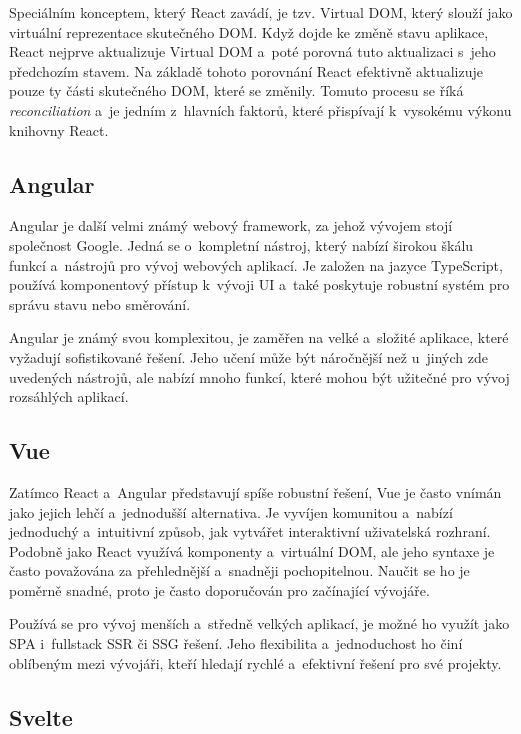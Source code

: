 Speciálním konceptem, který React zavádí, je tzv. Virtual DOM, který slouží jako virtuální reprezentace skutečného DOM.
Když dojde ke změně stavu aplikace, React nejprve aktualizuje Virtual DOM a~poté porovná tuto aktualizaci s~jeho předchozím stavem.
Na základě tohoto porovnání React efektivně aktualizuje pouze ty části skutečného DOM, které se změnily.
Tomuto procesu se říká \textit{reconciliation} a~je jedním z~hlavních faktorů, které přispívají k~vysokému výkonu knihovny React.~\cite{react}

\subsection{Angular}
\label{subsec:angular}

Angular je další velmi známý webový framework, za jehož vývojem stojí společnost Google.
Jedná se o~kompletní nástroj, který nabízí širokou škálu funkcí a~nástrojů pro vývoj webových aplikací.
Je založen na jazyce TypeScript, používá komponentový přístup k~vývoji UI a~také poskytuje robustní systém pro správu stavu nebo směrování.~\cite{angular}

Angular je známý svou komplexitou, je zaměřen na velké a~složité aplikace, které vyžadují sofistikované řešení.
Jeho učení může být náročnější než u~jiných zde uvedených nástrojů, ale nabízí mnoho funkcí, které mohou být užitečné pro vývoj rozsáhlých aplikací.~\cite{angular}

\subsection{Vue}
\label{subsec:vue}

Zatímco React a~Angular představují spíše robustní řešení, Vue je často vnímán jako jejich lehčí a~jednodušší alternativa.
Je vyvíjen komunitou a~nabízí jednoduchý a~intuitivní způsob, jak vytvářet interaktivní uživatelská rozhraní.
Podobně jako React využívá komponenty a~virtuální DOM, ale jeho syntaxe je často považována za přehlednější a~snadněji pochopitelnou.
Naučit se ho je poměrně snadné, proto je často doporučován pro začínající vývojáře.~\cite{vue}

Používá se pro vývoj menších a~středně velkých aplikací, je možné ho využít jako SPA i~fullstack SSR či SSG řešení.
Jeho flexibilita a~jednoduchost ho činí oblíbeným mezi vývojáři, kteří hledají rychlé a~efektivní řešení pro své projekty.~\cite{vue}

\subsection{Svelte}
\label{subsec:svelte}

